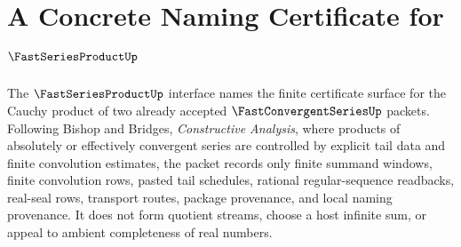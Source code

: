 \chapter{A Concrete Naming Certificate for $\FastSeriesProductUp$}
\label{ch:concrete-instances-fastseriesproduct-namecert}

The $\FastSeriesProductUp$ interface names the finite certificate surface for the Cauchy product of two already accepted $\FastConvergentSeriesUp$ packets. Following Bishop and Bridges, \emph{Constructive Analysis}, where products of absolutely or effectively convergent series are controlled by explicit tail data and finite convolution estimates, the packet records only finite summand windows, finite convolution rows, pasted tail schedules, rational regular-sequence readbacks, real-seal rows, transport routes, package provenance, and local naming provenance. It does not form quotient streams, choose a host infinite sum, or appeal to ambient completeness of real numbers.

